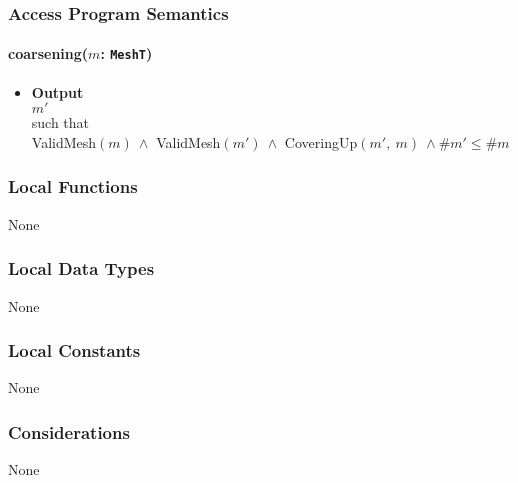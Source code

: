 \documentclass[12pt,titlepage]{article}
\begin{document}
\subsubsection{Access Program Semantics}
\paragraph{coarsening($m$: {\tt MeshT})}
\begin{itemize}
\item \textbf{Output}\\ 
$m'$ \\such that\\
ValidMesh$(m)\ \wedge$ ValidMesh$(m')\ \wedge$ CoveringUp$(m',\ m)\ \wedge \# m' \leq \# m$
\end{itemize}

\subsubsection{Local Functions} None
\subsubsection{Local Data Types} None
\subsubsection{Local Constants} None
\subsubsection{Considerations} None

\newpage



\end{document}
